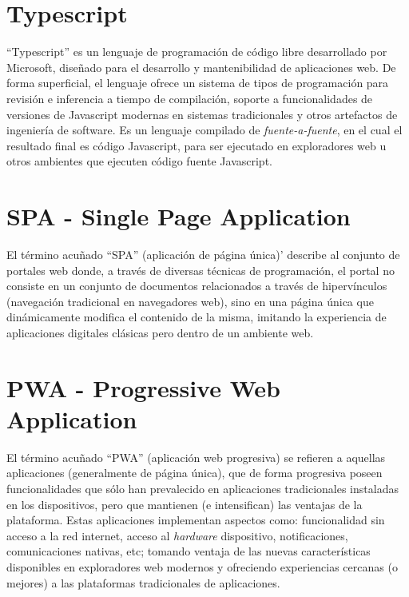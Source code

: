 \section{Typescript}

``Typescript'' es un lenguaje de programación de código libre desarrollado por Microsoft, diseñado para el desarrollo y mantenibilidad de aplicaciones web. De forma superficial, el lenguaje ofrece un sistema de tipos de programación para revisión e inferencia a tiempo de compilación, soporte a funcionalidades de versiones de Javascript modernas en sistemas tradicionales y otros artefactos de ingeniería de software. Es un lenguaje compilado de \textit{fuente-a-fuente}, en el cual el resultado final es código Javascript, para ser ejecutado en exploradores web u otros ambientes que ejecuten código fuente Javascript.

\section{SPA - Single Page Application}

El término acuñado ``SPA'' (aplicación de página única)' describe al conjunto de portales web donde, a través de diversas técnicas de programación, el portal no consiste en un conjunto de documentos relacionados a través de hipervínculos (navegación tradicional en navegadores web), sino en una página única que dinámicamente modifica el contenido de la misma, imitando la experiencia de aplicaciones digitales clásicas pero dentro de un ambiente web.

\section{PWA - Progressive Web Application}

El término acuñado ``PWA'' (aplicación web progresiva) se refieren a aquellas aplicaciones (generalmente de página única), que de forma progresiva poseen funcionalidades que sólo han prevalecido en aplicaciones tradicionales instaladas en los dispositivos, pero que mantienen (e intensifican) las ventajas de la plataforma. Estas aplicaciones implementan aspectos como: funcionalidad sin acceso a la red internet, acceso al \textit{hardware} dispositivo, notificaciones, comunicaciones nativas, etc; tomando ventaja de las nuevas características disponibles en exploradores web modernos y ofreciendo experiencias cercanas (o mejores) a las plataformas tradicionales de aplicaciones.

